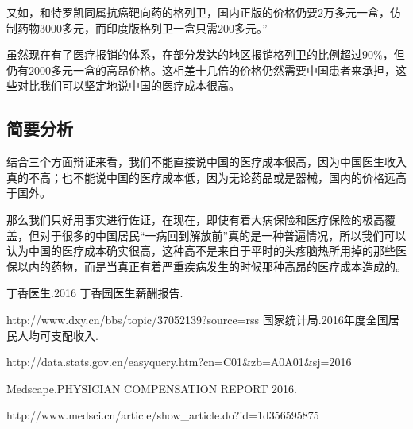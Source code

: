 \documentclass[11pt,twoside,a4paper]{article}
\begin{document}
		又如，和特罗凯同属抗癌靶向药的格列卫，国内正版的价格仍要$2$万多元一盒，仿制药物$3000$多元，而印度版格列卫一盒只需$200$多元。”
		
		虽然现在有了医疗报销的体系，在部分发达的地区报销格列卫的比例超过$90\%$，但仍有$2000$多元一盒的高昂价格。这相差十几倍的价格仍然需要中国患者来承担，这些对比我们可以坚定地说中国的医疗成本很高。
		
		\subsection{简要分析}
		结合三个方面辩证来看，我们不能直接说中国的医疗成本很高，因为中国医生收入真的不高；也不能说中国的医疗成本低，因为无论药品或是器械，国内的价格远高于国外。
		
		那么我们只好用事实进行佐证，在现在，即使有着大病保险和医疗保险的极高覆盖，但对于很多的中国居民“一病回到解放前”真的是一种普遍情况，所以我们可以认为中国的医疗成本确实很高，这种高不是来自于平时的头疼脑热所用掉的那些医保以内的药物，而是当真正有着严重疾病发生的时候那种高昂的医疗成本造成的。
		
		\begin{thebibliography}{99}  
			丁香医生.2016 丁香园医生薪酬报告.
			
			http://www.dxy.cn/bbs/topic/37052139?source=rss
			国家统计局.2016年度全国居民人均可支配收入.
			
			http://data.stats.gov.cn/easyquery.htm?cn=C01\&zb=A0A01\&sj=2016 
			
			Medscape.PHYSICIAN COMPENSATION REPORT 2016.
			
			http://www.medsci.cn/article/show\_article.do?id=1d356595875
		\end{thebibliography} 
\end{document}
